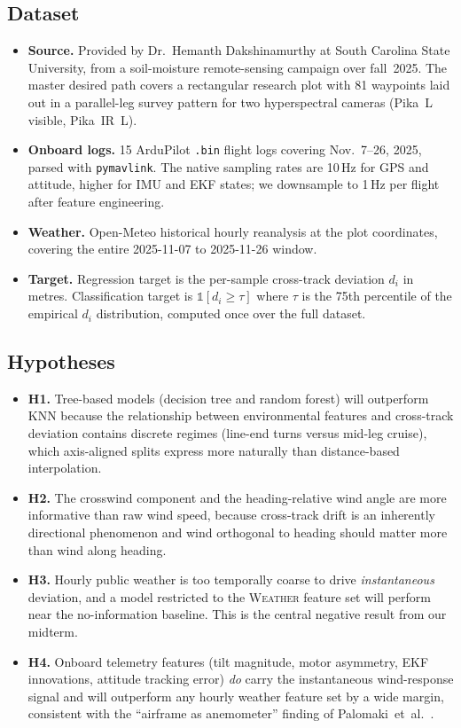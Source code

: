 \documentclass[sigconf, nonacm]{acmart}
\begin{document}
\subsection{Dataset}
\begin{itemize}[leftmargin=1.2em]
  \item \textbf{Source.}  Provided by Dr.\ Hemanth Dakshinamurthy at
  South Carolina State University, from a soil-moisture remote-sensing
  campaign over fall~2025.  The master desired path covers a rectangular
  research plot with 81 waypoints laid out in a parallel-leg survey
  pattern for two hyperspectral cameras (Pika~L visible, Pika~IR~L).
  \item \textbf{Onboard logs.}  15 ArduPilot \texttt{.bin} flight logs
  covering Nov.~7--26, 2025, parsed with \texttt{pymavlink}.  The native
  sampling rates are 10\,Hz for GPS and attitude, higher for IMU and EKF
  states; we downsample to 1\,Hz per flight after feature engineering.
  \item \textbf{Weather.}  Open-Meteo historical hourly reanalysis at the
  plot coordinates, covering the entire 2025-11-07 to 2025-11-26 window.
  \item \textbf{Target.}  Regression target is the per-sample cross-track
  deviation $d_i$ in metres.  Classification target is
  $\mathbb{1}[d_i \geq \tau]$ where $\tau$ is the 75th percentile of the
  empirical $d_i$ distribution, computed once over the full dataset.
\end{itemize}

\subsection{Hypotheses}
\begin{itemize}[leftmargin=1.2em]
  \item \textbf{H1.}  Tree-based models (decision tree and random forest)
  will outperform KNN because the relationship between environmental
  features and cross-track deviation contains discrete regimes (line-end
  turns versus mid-leg cruise), which axis-aligned splits express more
  naturally than distance-based interpolation.
  \item \textbf{H2.}  The crosswind component and the heading-relative
  wind angle are more informative than raw wind speed, because cross-track
  drift is an inherently directional phenomenon and wind orthogonal to
  heading should matter more than wind along heading.
  \item \textbf{H3.}  Hourly public weather is too temporally coarse to
  drive \emph{instantaneous} deviation, and a model restricted to the
  \textsc{Weather} feature set will perform near the no-information
  baseline.  This is the central negative result from our midterm.
  \item \textbf{H4.}  Onboard telemetry features (tilt magnitude, motor
  asymmetry, EKF innovations, attitude tracking error) \emph{do} carry the
  instantaneous wind-response signal and will outperform any hourly
  weather feature set by a wide margin, consistent with the ``airframe as
  anemometer'' finding of Palomaki~et~al.~\cite{palomaki2017}.
\end{itemize}
\end{document}

